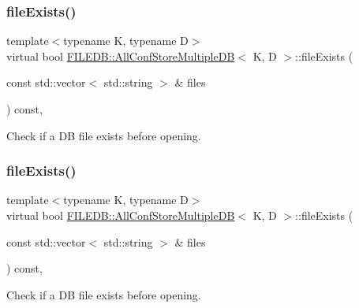 \subsubsection{\texorpdfstring{fileExists()}{fileExists()}\hspace{0.1cm}{\footnotesize\ttfamily [2/3]}}
{\footnotesize\ttfamily template$<$typename K, typename D$>$ \\
virtual bool \mbox{\hyperlink{classFILEDB_1_1AllConfStoreMultipleDB}{F\+I\+L\+E\+D\+B\+::\+All\+Conf\+Store\+Multiple\+DB}}$<$ K, D $>$\+::file\+Exists (\begin{DoxyParamCaption}\item[{const std\+::vector$<$ std\+::string $>$ \&}]{files }\end{DoxyParamCaption}) const\hspace{0.3cm}{\ttfamily [inline]}, {\ttfamily [virtual]}}

Check if a DB file exists before opening. \mbox{\label{classFILEDB_1_1AllConfStoreMultipleDB_aa5a7c38b3785226da6f30a4ab5e51428}} 
\subsubsection{\texorpdfstring{fileExists()}{fileExists()}\hspace{0.1cm}{\footnotesize\ttfamily [3/3]}}
{\footnotesize\ttfamily template$<$typename K, typename D$>$ \\
virtual bool \mbox{\hyperlink{classFILEDB_1_1AllConfStoreMultipleDB}{F\+I\+L\+E\+D\+B\+::\+All\+Conf\+Store\+Multiple\+DB}}$<$ K, D $>$\+::file\+Exists (\begin{DoxyParamCaption}\item[{const std\+::vector$<$ std\+::string $>$ \&}]{files }\end{DoxyParamCaption}) const\hspace{0.3cm}{\ttfamily [inline]}, {\ttfamily [virtual]}}

Check if a DB file exists before opening. \mbox{\label{classFILEDB_1_1AllConfStoreMultipleDB_a3a9858458bf0ecc76133e1c448568cf5}} 
